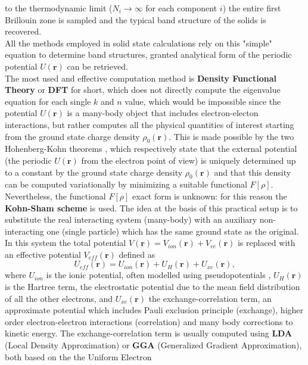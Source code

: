 to the thermodynamic limit ($N_i\to\infty$ for each component $i$) the entire first Brillouin zone is sampled and the typical band 
structure of the solids is recovered.\\
All the methods employed in solid state calculations rely on this "simple" equation to determine band structures, granted 
analytical form of the periodic potential $U(\mathbf{r})$ can be retrieved.\\
The most used and effective computation method is \textbf{Density Functional Theory} \cite{thijssen2007computational} or \textbf{DFT} 
for short, which does not directly compute the eigenvalue equation for each single $k$ and $n$ value, which would be impossible since 
the potential $U(\mathbf{r})$ is a many-body object that includes electron-electon interactions, but rather computes all the physical quantities of 
interest starting from the ground state charge density $\rho_0(\mathbf{r})$. This is made possible by the two Hohenberg-Kohn theorems \cite{hohenberg1964inhomogeneous}, 
which respectively state that the external potential (the periodic $U(\mathbf{r})$ from the electron point of view) is uniquely determined 
up to a constant by the ground state charge density $\rho_0(\mathbf{r})$ and that this density can be computed variationally by minimizing a suitable 
functional $F[\rho]$.\\
Nevertheless, the functional $F[\rho]$ exact form is unknown: for this reason the \textbf{Kohn-Sham scheme} \cite{PhysRev.140.A1133} 
is used. The idea at the basis of this practical setup is to substitute the real interacting system (many-body) with an auxiliary non-interacting
one (single particle) which has the same ground state as the original. In this system the total potential $V(\mathbf{r})=V_{ion}(\mathbf{r})+V_{ee}(\mathbf{r})$ is 
replaced with an effective potential $V_{eff}(\mathbf{r})$ defined as
\begin{equation}
    U_{eff}(\mathbf{r})=U_{ion}(\mathbf{r})+U_H(\mathbf{r})+U_{xc}(\mathbf{r}),
\end{equation}
where $U_{ion}$ is the ionic potential, often modelled using pseudopotentials \cite{kerker1980non}, $U_H(\mathbf{r})$ is the Hartree term, the electrostatic 
potential due to the mean field distribution of all the other electrons, and $U_{xc}(\mathbf{r})$ the exchange-correlation term, an approximate potential 
which includes Pauli exclusion principle (exchange), higher order electron-electron interactions (correlation) and many body corrections to kinetic energy. The exchange-correlation 
term is usually computed using \textbf{LDA} (Local Density Approximation) or \textbf{GGA} (Generalized Gradient Approximation), both based on the the Uniform Electron 
